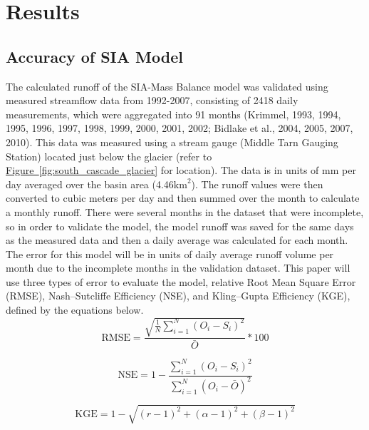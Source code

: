 \documentclass{article}
\begin{document}
\section{Results}
\subsection{Accuracy of SIA Model}
The calculated runoff of the SIA-Mass Balance model was validated using measured streamflow data from 1992-2007, consisting of 2418 
daily measurements, which were aggregated into 91 months (Krimmel, 1993, 1994, 1995, 1996, 1997, 1998, 1999, 2000, 2001, 2002; Bidlake et al., 2004, 2005, 2007, 2010). This data was measured using 
a stream gauge (Middle Tarn Gauging Station) located just below the glacier (refer to \hyperref[fig:south_cascade_glacier]{Figure~\ref*{fig:south_cascade_glacier}}  for location). 
The data is in units of mm per day averaged over the basin area (4.46$\text{km}^2$). The runoff values were then converted to cubic meters per day and then 
summed over the month to calculate a monthly runoff. There were several months in the dataset that were incomplete, so in order to validate the model, the model runoff was saved 
for the same days as the measured data and then a daily average was calculated for each month.
The error for this model will be in units of daily average runoff volume per month due to the incomplete months in the validation dataset. 
This paper will use three types of error to evaluate the model, relative Root Mean Square Error (RMSE), Nash–Sutcliffe Efficiency (NSE), and Kling–Gupta Efficiency 
(KGE), defined by the equations below. 
\begin{equation}
    \mathrm{RMSE} = \frac{\sqrt{\frac{1}{N}\sum_{i=1}^{N} \left( O_i - S_i \right)^2}}{\bar{O}}*100 \label{tab:rmse_runoff_eq}
\end{equation}

\begin{equation}
    \mathrm{NSE} = 1 - \frac{\sum_{i=1}^{N}\left( O_i - S_i \right)^2}{\sum_{i=1}^{N}\left( O_i - \bar{O} \right)^2} \label{tab:nse}
\end{equation}

\begin{equation}
    \mathrm{KGE} = 1 - \sqrt{ (r-1)^2 + (\alpha-1)^2 + (\beta-1)^2 } \label{tab:kge}
\end{equation}
\end{document}
